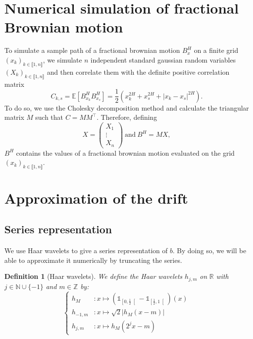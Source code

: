 \documentclass{article}[12pt]
\newtheorem{defi}{Definition}[section]
\newcommand{\R}{\mathbb{R}}
\newcommand{\Z}{\mathbb{Z}}
\newcommand{\N}{\mathbb{N}}
\newcommand{\E}{\mathbb{E}}
\begin{document}
\section{Numerical simulation of fractional Brownian motion}    

    To simulate a sample path of a fractional brownian motion $B^H_x$ on a finite grid $(x_k)_{k\in\llbracket1,n\rrbracket}$, we simulate $n$ independent standard gaussian random variables $(X_k)_{k\in\llbracket1,n\rrbracket}$ and then correlate them with the definite positive correlation matrix 
    $$C_{k,s}=\E\left[B_{x_k}^HB_{x_s}^H\right]=\frac{1}{2}\left(x_k^{2H}+x_s^{2H}+|x_k-x_s|^{2H}\right).$$
    To do so, we use the Cholesky decomposition method and calculate the triangular matrix $M$ such that $C=MM^\top$. Therefore, defining
    $$X = \begin{pmatrix}
    X_1 \\ \vdots \\ X_n
    \end{pmatrix}\ \mathrm{and}\ B^H = MX,$$
    $B^H$ contains the values of a fractional brownian motion evaluated on the grid $(x_k)_{k\in\llbracket1,n\rrbracket}$.
    
\section{Approximation of the drift}
    \subsection{Series representation}
    \paragraph{}
    We use Haar wavelets to give a series representation of $b$. By doing so, we will be able to approximate it numerically by truncating the series.
    
    \begin{defi}[Haar wavelets]
        We define the Haar wavelets $h_{j,m}$ on $\R$ with $j\in\N\cup\{-1\}$ and $m\in\Z$ by:
        $$\begin{cases}
        h_M&:x\longmapsto\left(\mathds{1}_{\left[0,\frac{1}{2}\right[}-\mathds{1}_{\left[\frac{1}{2},1\right[}\right)(x)\\ h_{-1,m}&:x\longmapsto\sqrt{2}|h_M(x-m)|\\
        h_{j,m}&:x\longmapsto h_M(2^jx-m) 
        \end{cases}$$
    \end{defi}
    
\end{document}
